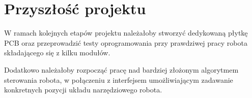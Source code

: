 \section{Przyszłość projektu}
W ramach kolejnych etapów projektu należałoby stworzyć dedykowaną płytkę PCB oraz przeprowadzić testy oprogramowania przy prawdziwej pracy robota składającego się z kilku modułów.

Dodatkowo należałoby rozpocząć pracę nad bardziej złożonym algorytmem sterowania robota, w połączeniu z interfejsem umożliwiającym zadawanie konkretnych pozycji układu narzędziowego robota.
